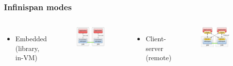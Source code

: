 \documentclass[10pt,utf8]{beamer}
\begin{document}
\begin{frame}
  \frametitle{Infinispan modes}
	\begin{columns}
		\begin{itemize}
			\item Embedded (library, in-VM)
		\end{itemize}
		\begin{figure}
			\includegraphics[width=5cm]{./img/ispn-emb.eps}
		\end{figure}
		\begin{itemize}
			\item Client-server (remote)
		\end{itemize}
		\begin{figure}
			\includegraphics[width=5cm]{./img/ispn-cs.eps}
		\end{figure}
	\end{columns}
\end{frame}
\end{document}

